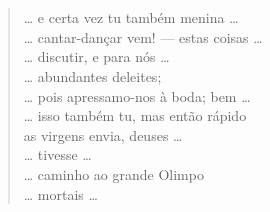 \section*{}
\begin{verse}
\ldots{} e certa vez tu também menina \ldots{}\\
\ldots{} cantar-dançar vem! --- estas coisas \ldots{}\\
\ldots{} discutir, e para nós \ldots{}\\
\ldots{} abundantes deleites;\\
\ldots{} pois apressamo-nos à boda; bem \ldots{}\\
\ldots{} isso também tu, mas então rápido\\
as virgens envia, deuses \ldots{}\\
\ldots{} tivesse \ldots{}\\
\ldots{} caminho ao grande Olimpo\\
\ldots{} mortais \ldots{}
\end{verse}

\medskip


